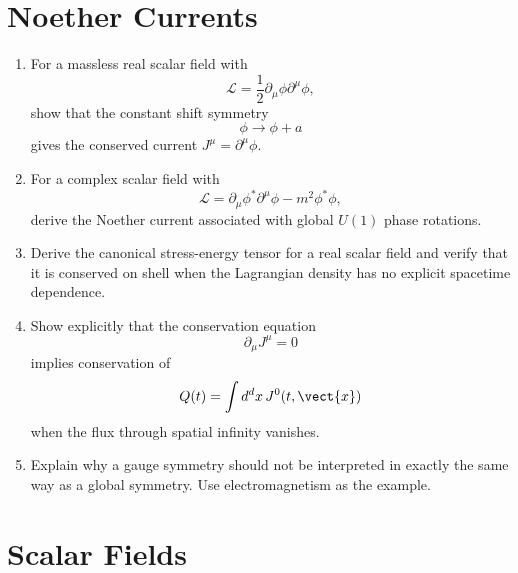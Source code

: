 \section{Noether Currents}

\begin{enumerate}
    \item For a massless real scalar field with
    \[
        \mathcal{L}=\frac{1}{2}\partial_\mu\phi\partial^\mu\phi,
    \]
    show that the constant shift symmetry
    \[
        \phi\longrightarrow \phi+a
    \]
    gives the conserved current \(J^\mu=\partial^\mu\phi\).

    \item For a complex scalar field with
    \[
        \mathcal{L}=\partial_\mu\phi^*\partial^\mu\phi-m^2\phi^*\phi,
    \]
    derive the Noether current associated with global \(U(1)\) phase rotations.

    \item Derive the canonical stress-energy tensor for a real scalar field and
    verify that it is conserved on shell when the Lagrangian density has no
    explicit spacetime dependence.

    \item Show explicitly that the conservation equation
    \[
        \partial_\mu J^\mu=0
    \]
    implies conservation of
    \[
        Q(t)=\int d^d x\,J^0(t,\vect{x})
    \]
    when the flux through spatial infinity vanishes.

    \item Explain why a gauge symmetry should not be interpreted in exactly the
    same way as a global symmetry. Use electromagnetism as the example.
\end{enumerate}

\section{Scalar Fields}

